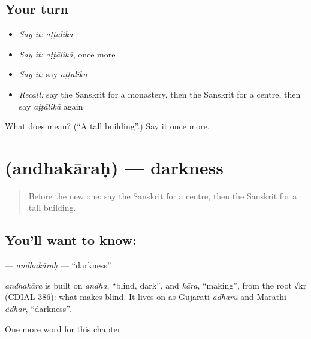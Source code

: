 \subsection*{Your turn}
\begin{itemize}
\raggedright
  \item \emph{Say it:} \emph{aṭṭālikā}
  \item \emph{Say it:} \emph{aṭṭālikā}, once more
  \item \emph{Say it:} say \emph{aṭṭālikā}
  \item \emph{Recall:} say the Sanskrit for a monastery, then the Sanskrit for a centre, then say \emph{aṭṭālikā} again
\end{itemize}

\begin{tcolorbox}[breakable,colback=teal!4,colframe=teal!35!black,title={Before you move on}]
What does  mean? (\textquotedblleft{}A tall building\textquotedblright{}.) Say it once more.
\end{tcolorbox}
\section[\texorpdfstring{\sk{अन्धकारः} (andhakāraḥ)}{अन्धकारः (andhakāraḥ)}]{ (andhakāraḥ) — darkness}

\label{lesson:SA-C224-andhakarah}



\begin{quote}
Before the new one: say the Sanskrit for a centre, then the Sanskrit for a tall building.
\end{quote}

\subsection*{You'll want to know: }
\textbf{} — \emph{andhakāraḥ} — \textquotedblleft{}darkness\textquotedblright{}.

\begin{cousinweb}
\emph{andhakāra} is built on \emph{andha}, \textquotedblleft{}blind, dark\textquotedblright{}, and \emph{kāra}, \textquotedblleft{}making\textquotedblright{}, from the root √kṛ (CDIAL 386): what makes blind. It lives on as Gujarati \emph{ãdhārũ} and Marathi \emph{ãdhār}, \textquotedblleft{}darkness\textquotedblright{}.
\end{cousinweb}

\begin{grammarlens}[title={What you've built}]
One more word for this chapter.
\end{grammarlens}

